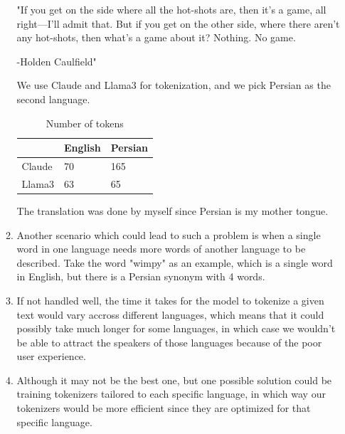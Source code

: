 \documentclass[12pt]{article}
\begin{document}
\begin{center}
\begin{enumerate}[label=(\alph*)]
\begin{enumerate}
	 "If you get on the side where all the hot-shots are, then it’s a game, all right—I’ll admit that. But if you get on the other side, where there aren’t any hot-shots, then what’s a game about it? Nothing. No game.
	
	-Holden Caulfield"
	
	We use Claude and Llama3 for tokenization, and we pick Persian as the second language.
	
\begin{table}[!ht]
	\centering
	\begin{tabular}{|l|l|l|}
		\hline
		 &English& Persian \\ \hline
		Claude & 70 & 165  \\ \hline
		Llama3 & 63 & 65 \\ \hline
		
		
	\end{tabular}

	\caption{Number of tokens}

\end{table}
		The translation was done by myself since Persian is my mother tongue.
		
		\item Another scenario which could lead to such a problem is when a single word in one language needs more words of another language to be described. Take the word "wimpy" as an example, which is a single word in English, but there is a Persian synonym with 4 words.
		
		\item If not handled well, the time it takes for the model to tokenize a given text would vary accross different languages, which means that it could possibly take much longer for some languages, in which case we wouldn't be able to attract the speakers of those languages because of the poor user experience.
		
		\item Although it may not be the best one, but one possible solution could be training tokenizers tailored to each specific language, in which way our tokenizers would be more efficient since they are optimized for that specific language.
\end{enumerate}
\end{enumerate}
\end{center}
\end{document}
